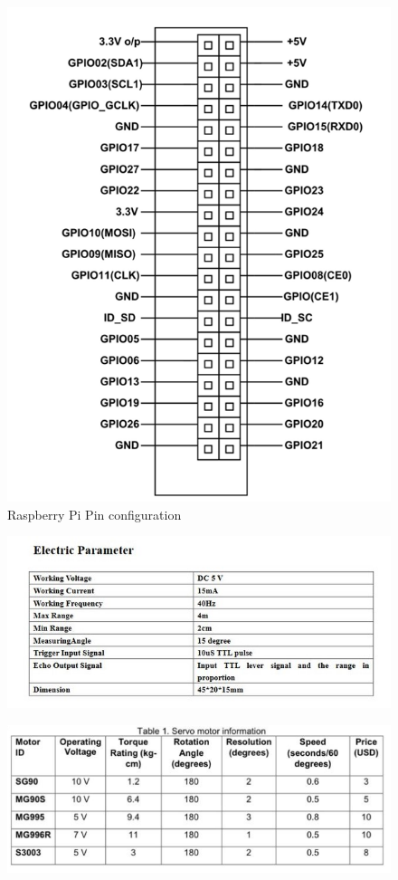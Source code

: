 \begin{figure}[h]
    \centering
    \includegraphics[width=1\linewidth]{Graphics/raspberrypi_pin.png}
    \caption{Raspberry Pi Pin configuration}
    \label{fig:enter-label}
\end{figure}
\begin{figure}[h]
    \centering
    \includegraphics[width=1\linewidth]{Graphics/ultrasonicsensorDatasheet.jpeg}
    \label{fig:enter-label}
\end{figure}
\begin{figure}[h]
    \centering
    \includegraphics[width=1\linewidth]{servoDatasheeet.png}
    \label{fig:enter-label}
\end{figure}
